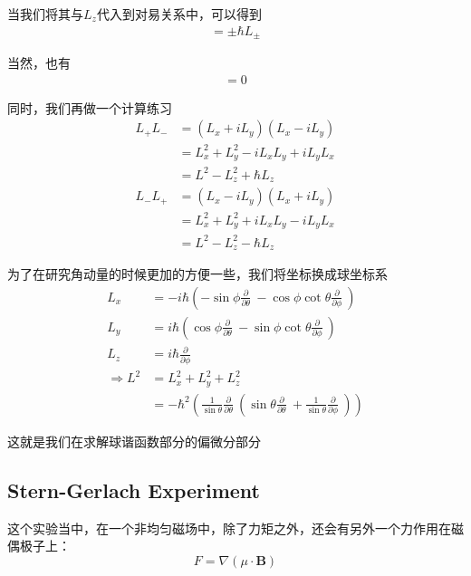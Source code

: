 \documentclass{article}
\newcommand{\Da}[2]{\frac{\partial}{\partial#2}#1}
\begin{document}
当我们将其与$L_z$代入到对易关系中，可以得到
\begin{align*}
	[L_z,L_{\pm}]=\pm\hbar L_{\pm}
\end{align*}

当然，也有
\begin{align*}
	[L^2,L_{\pm}]=0
\end{align*}

同时，我们再做一个计算练习
\begin{align*}
	L_+L_- & =(L_x+iL_y)(L_x-iL_y)        \\
	       & =L_x^2+L_y^2-iL_xL_y+iL_yL_x \\
	       & =L^2-L_z^2+\hbar L_z         \\
	L_-L_+ & =(L_x-iL_y)(L_x+iL_y)        \\
	       & =L_x^2+L_y^2+iL_xL_y-iL_yL_x \\
	       & =L^2-L_z^2-\hbar L_z
\end{align*}


为了在研究角动量的时候更加的方便一些，我们将坐标换成球坐标系
\begin{align*}
	L_x             & =-i\hbar\left(-\sin\phi\Da{~}{\theta}-\cos\phi\cot\theta\Da{~}{\phi}\right)                                                    \\
	L_y             & =i\hbar\left(\cos\phi\Da{~}{\theta}-\sin\phi\cot\theta\Da{~}{\phi}\right)                                                      \\
	L_z             & =i\hbar\Da{~}{\phi}                                                                                                            \\
	\Rightarrow L^2 & =L_x^2+L_y^2+L_z^2                                                                                                             \\
	                & =-\hbar^2\left(\frac{1}{\sin\theta}\Da{~}{\theta}\left(\sin\theta\Da{~}{\theta}+\frac{1}{\sin\theta}\Da{~}{\phi}\right)\right)
\end{align*}

这就是我们在求解球谐函数部分的偏微分部分


\subsection{Stern-Gerlach Experiment}

这个实验当中，在一个非均匀磁场中，除了力矩之外，还会有另外一个力作用在磁偶极子上：
\begin{equation*}
	F=\nabla\left(\mu\cdot \textbf{B}\right)
\end{equation*}
\end{document}
